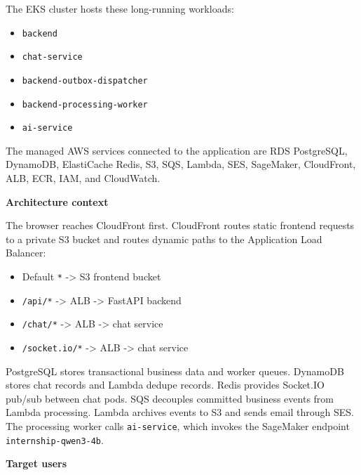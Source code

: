 The EKS cluster hosts these long-running workloads:

\begin{itemize}
\tightlist
\item
  \texttt{backend}
\item
  \texttt{chat-\allowbreak{}service}
\item
  \texttt{backend-\allowbreak{}outbox-\allowbreak{}dispatcher}
\item
  \texttt{backend-\allowbreak{}processing-\allowbreak{}worker}
\item
  \texttt{ai-\allowbreak{}service}
\end{itemize}

The managed AWS services connected to the application are RDS
PostgreSQL, DynamoDB, ElastiCache Redis, S3, SQS, Lambda, SES,
SageMaker, CloudFront, ALB, ECR, IAM, and CloudWatch.

\vspace{0.5em}\noindent\textbf{Architecture context}\par

The browser reaches CloudFront first. CloudFront routes static frontend
requests to a private S3 bucket and routes dynamic paths to the
Application Load Balancer:

\begin{itemize}
\tightlist
\item
  Default \texttt{*} -\textgreater{} S3 frontend bucket
\item
  \texttt{/\allowbreak{}api/\allowbreak{}*} -\textgreater{} ALB -\textgreater{} FastAPI backend
\item
  \texttt{/\allowbreak{}chat/\allowbreak{}*} -\textgreater{} ALB -\textgreater{} chat service
\item
  \texttt{/\allowbreak{}socket.\allowbreak{}io/\allowbreak{}*} -\textgreater{} ALB -\textgreater{} chat service
\end{itemize}

PostgreSQL stores transactional business data and worker queues.
DynamoDB stores chat records and Lambda dedupe records. Redis provides
Socket.IO pub/sub between chat pods. SQS decouples committed business
events from Lambda processing. Lambda archives events to S3 and sends
email through SES. The processing worker calls \texttt{ai-\allowbreak{}service},
which invokes the SageMaker endpoint \texttt{internship-\allowbreak{}qwen3-\allowbreak{}4b}.

\vspace{0.5em}\noindent\textbf{Target users}\par

